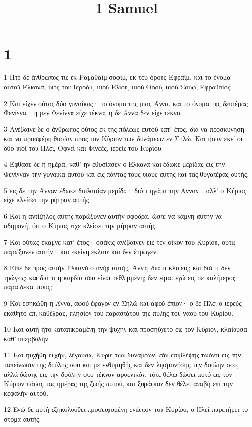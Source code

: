 

\title{1 Samuel}


\chapter{1}

\par 1 Ήτο δε άνθρωπός τις εκ Ραμαθαΐμ-σοφίμ, εκ του όρους Εφραΐμ, και το όνομα αυτού Ελκανά, υιός του Ιεροάμ, υιού Ελιού, υιού Θοού, υιού Σούφ, Εφραθαίος.
\par 2 Και είχεν ούτος δύο γυναίκας· το όνομα της μιας Άννα, και το όνομα της δευτέρας Φενίννα· η μεν Φενίννα είχε τέκνα, η δε Άννα δεν είχε τέκνα.
\par 3 Ανέβαινε δε ο άνθρωπος ούτος εκ της πόλεως αυτού κατ' έτος, διά να προσκυνήση και να προσφέρη θυσίαν προς τον Κύριον των δυνάμεων εν Σηλώ. Και ήσαν εκεί οι δύο υιοί του Ηλεί, Οφνεί και Φινεές, ιερείς του Κυρίου.
\par 4 Έφθασε δε η ημέρα, καθ' ην εθυσίασεν ο Ελκανά και έδωκε μερίδας εις την Φενίνναν την γυναίκα αυτού και εις πάντας τους υιούς αυτής και τας θυγατέρας αυτής.
\par 5 εις δε την Άνναν έδωκε διπλασίαν μερίδα· διότι ηγάπα την Ανναν· αλλ' ο Κύριος είχε κλείσει την μήτραν αυτής.
\par 6 Και η αντίζηλος αυτής παρώξυνεν αυτήν σφόδρα, ώστε να κάμνη αυτήν να αδημονή, ότι ο Κύριος είχε κλείσει την μήτραν αυτής.
\par 7 Και ούτως έκαμνε κατ' έτος· οσάκις ανέβαινεν εις τον οίκον του Κυρίου, ούτω παρώξυνεν αυτήν· και εκείνη έκλαιε και δεν έτρωγεν.
\par 8 Είπε δε προς αυτήν Ελκανά ο ανήρ αυτής, Άννα, διά τι κλαίεις; και διά τι δεν τρώγεις; και διά τι η καρδία σου είναι τεθλιμμένη; δεν είμαι εγώ εις σε καλήτερος παρά δέκα υιούς;
\par 9 Και εσηκώθη η Άννα, αφού έφαγον εν Σηλώ και αφού έπιον· ο δε Ηλεί ο ιερεύς εκάθητο επί καθέδρας, πλησίον του παραστάτου της πύλης του ναού του Κυρίου.
\par 10 Και αυτή ήτο καταπικραμένη την ψυχήν και προσηύχετο εις τον Κύριον, κλαίουσα καθ' υπερβολήν.
\par 11 Και ηυχήθη ευχήν, λέγουσα, Κύριε των δυνάμεων, εάν επιβλέψης τωόντι εις την ταπείνωσιν της δούλης σου και με ενθυμηθής και δεν λησμονήσης την δούλην σου, αλλά δώσης εις την δούλην σου τέκνον αρσενικόν, τότε θέλω δώσει αυτό εις τον Κύριον πάσας τας ημέρας της ζωής αυτού, και ξυράφιον δεν θέλει αναβή επί την κεφαλήν αυτού.
\par 12 Ενώ δε αυτή εξηκολούθει προσευχομένη ενώπιον του Κυρίου, ο Ηλεί παρετήρει το στόμα αυτής.
